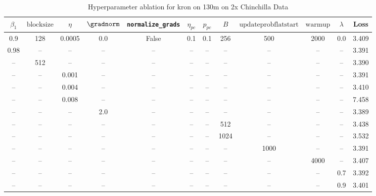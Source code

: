 \begin{table}[h!]
\centering
\caption{Hyperparameter ablation for kron on 130m on 2x Chinchilla Data}
\label{tab:ablation_kron_130m_on_2x_chinchilla_data}
\begin{tabular}{cccccccccccc}
\toprule
$\beta_1$ & $\mathrm{block size}$ & $\eta$ & $\gradnorm$ & \texttt{normalize\_grads} & $\eta_{pc}$ & $p_{pc}$ & $B$ & $\mathrm{update prob flat start}$ & $\mathrm{warmup}$ & $\lambda$ & Loss \\
\midrule
0.9 & 128 & 0.0005 & 0.0 & False & 0.1 & 0.1 & 256 & 500 & 2000 & 0.0 & 3.409 \\
\midrule
0.98 & -- & -- & -- & -- & -- & -- & -- & -- & -- & -- & 3.391 \\
-- & 512 & -- & -- & -- & -- & -- & -- & -- & -- & -- & 3.390 \\
-- & -- & 0.001 & -- & -- & -- & -- & -- & -- & -- & -- & 3.391 \\
-- & -- & 0.004 & -- & -- & -- & -- & -- & -- & -- & -- & 3.410 \\
-- & -- & 0.008 & -- & -- & -- & -- & -- & -- & -- & -- & 7.458 \\
-- & -- & -- & 2.0 & -- & -- & -- & -- & -- & -- & -- & 3.389 \\
-- & -- & -- & -- & -- & -- & -- & 512 & -- & -- & -- & 3.438 \\
-- & -- & -- & -- & -- & -- & -- & 1024 & -- & -- & -- & 3.532 \\
-- & -- & -- & -- & -- & -- & -- & -- & 1000 & -- & -- & 3.391 \\
-- & -- & -- & -- & -- & -- & -- & -- & -- & 4000 & -- & 3.407 \\
-- & -- & -- & -- & -- & -- & -- & -- & -- & -- & 0.7 & 3.392 \\
-- & -- & -- & -- & -- & -- & -- & -- & -- & -- & 0.9 & 3.401 \\
\bottomrule
\end{tabular}
\end{table}

